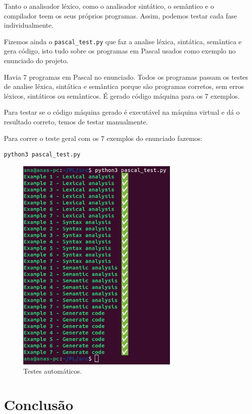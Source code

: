 \documentclass[12pt,a4paper]{report}
\begin{document}
Tanto o analisador léxico, como o analisador sintático, o semântico e o compilador teem os seus próprios programas. Assim, podemos testar cada fase individualmente.

Fizemos ainda o \texttt{pascal\_test.py} que faz a analise léxica, sintática, semântica e gera código, isto tudo sobre os programas em Pascal usados como exemplo no
enunciado do projeto.

Havia 7 programas em Pascal no enunciado. Todos os programas passam os testes de analise léxica, sintática e semântica porque são programas corretos, sem erros léxicos, sintáticos ou semânticos.
É gerado código máquina  para os 7 exemplos.

Para testar se o código máquina gerado é executável na máquina virtual e dá o resultado correto, temos de testar manualmente.

\vspace{1em}
Para correr o teste geral com os 7 exemplos do enunciado fazemos:
\begin{verbatim}
python3 pascal_test.py
\end{verbatim}

\begin{figure}[H]
    \centering
    \includegraphics[width=8cm]{images/tests.png}
    \caption{Testes automáticos.}    
\end{figure}

\chapter{Conclusão}
\end{document}
